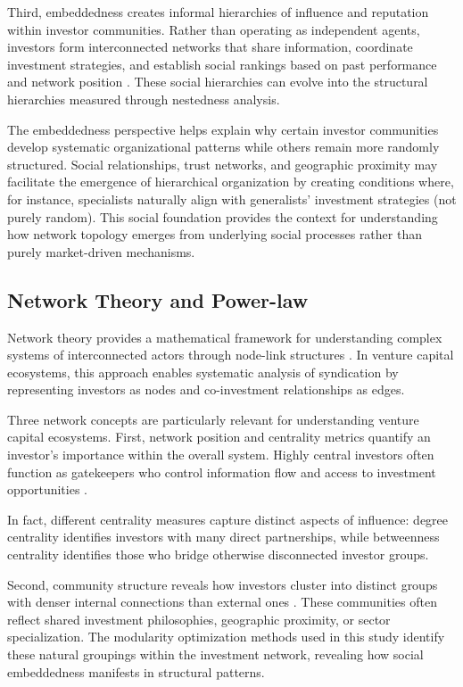 Third, embeddedness creates informal hierarchies of influence and reputation within investor communities. Rather than operating as independent agents, investors form interconnected networks that share information, coordinate investment strategies, and establish social rankings based on past performance and network position \cite{Granovetter1985}. These social hierarchies can evolve into the structural hierarchies measured through nestedness analysis.

The embeddedness perspective helps explain why certain investor communities develop systematic organizational patterns while others remain more randomly structured. Social relationships, trust networks, and geographic proximity may facilitate the emergence of hierarchical organization by creating conditions where, for instance, specialists naturally align with generalists' investment strategies (not purely random). This social foundation provides the context for understanding how network topology emerges from underlying social processes rather than purely market-driven mechanisms.

\subsection{Network Theory and Power-law}

Network theory provides a mathematical framework for understanding complex systems of interconnected actors through node-link structures \cite{Borgatti2011}. In venture capital ecosystems, this approach enables systematic analysis of syndication by representing investors as nodes and co-investment relationships as edges.

Three network concepts are particularly relevant for understanding venture capital ecosystems. First, network position and centrality metrics quantify an investor's importance within the overall system. Highly central investors often function as gatekeepers who control information flow and access to investment opportunities \cite{Borgatti2011}. 

In fact, different centrality measures capture distinct aspects of influence: degree centrality identifies investors with many direct partnerships, while betweenness centrality identifies those who bridge otherwise disconnected investor groups.

Second, community structure reveals how investors cluster into distinct groups with denser internal connections than external ones \cite{Theophile2024}. These communities often reflect shared investment philosophies, geographic proximity, or sector specialization. The modularity optimization methods used in this study identify these natural groupings within the investment network, revealing how social embeddedness manifests in structural patterns.

